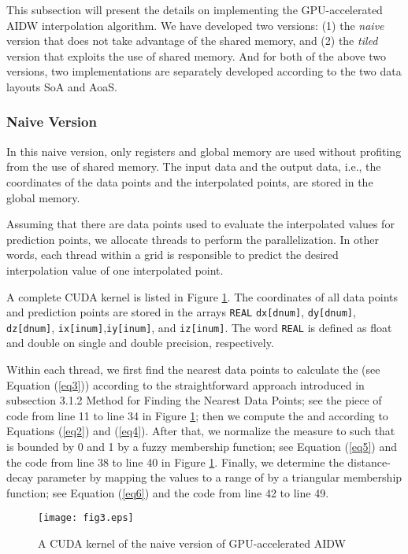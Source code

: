 \documentclass[fleqn,11pt]{wlscirep}
\begin{document}
This subsection will present the details on implementing the GPU-accelerated 
AIDW interpolation algorithm. We have developed two versions: (1) the 
\textit{naive} version that does not take advantage of the shared memory, and (2) the 
\textit{tiled} version that exploits the use of shared memory. And for both of the above 
two versions, two implementations are separately developed according to the 
two data layouts SoA and AoaS.

\subsubsection{Naive Version}

In this naive version, only registers and global memory are used without 
profiting from the use of shared memory. The input data and the output data, 
i.e., the coordinates of the data points and the interpolated points, are 
stored in the global memory. 

Assuming that there are  data points used to evaluate the interpolated 
values for  prediction points, we allocate  threads to perform the 
parallelization. In other words, each thread within a grid is responsible to 
predict the desired interpolation value of one interpolated point.

A complete CUDA kernel is listed in Figure \ref{fig3:CUDA Kernel}. The coordinates of all data 
points and prediction points are stored in the arrays \texttt{REAL} 
\texttt{dx[dnum]}, \texttt{dy[dnum]}, \texttt{dz[dnum]}, \texttt{ix[inum]},\texttt{iy[inum]}, and \texttt{iz[inum]}. The word \texttt{REAL} is 
defined as float and double on single and double precision, respectively.

Within each thread, we first find the  nearest data points to calculate the 
 (see Equation (\ref{eq3})) according to the straightforward approach 
introduced in subsection 3.1.2 Method for Finding the Nearest Data 
Points; see the piece of code from line 11 to line 34 in Figure \ref{fig3:CUDA Kernel}; 
then we compute the  and  according to 
Equations (\ref{eq2}) and (\ref{eq4}). After that, we normalize the  measure to  such that  is bounded by 0 and 1 by a 
fuzzy membership function; see Equation (\ref{eq5}) and the code from line 38 to 
line 40 in Figure \ref{fig3:CUDA Kernel}. Finally, we determine the distance-decay parameter 
 by mapping the  values to a range of  by 
a triangular membership function; see Equation (\ref{eq6}) and the code from line 42 
to line 49.

\begin{figure}[htbp]
	\centering
	\texttt{[image: fig3.eps]}
	\caption{A CUDA kernel of the naive version of GPU-accelerated AIDW}
	\label{fig3:CUDA Kernel}
\end{figure}
\end{document}
